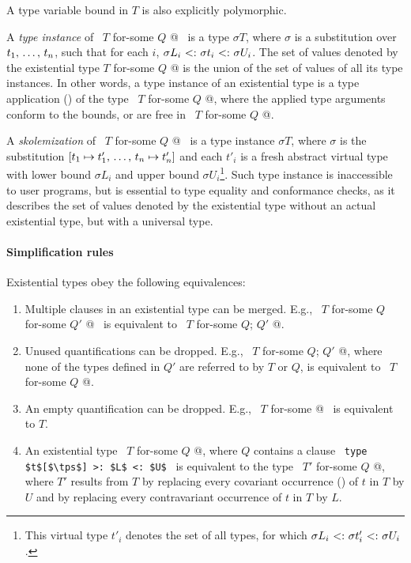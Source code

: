 A type variable bound in $T$ is also explicitly polymorphic. 

A {\em type instance} of ~\lstinline@$T$ for-some { $Q$ }@~ is a type $\sigma T$, where $\sigma$ is a substitution over $t_1 ,\, \ldots ,\, t_n$, such that for each $i$, $\sigma L_i \conforms \sigma t_i \conforms \sigma U_i$. The set of values denoted by the existential type \lstinline@$T$ for-some { $Q$ }@ is the union of the set of values of all its type instances. In other words, a type instance of an existential type is a type application () of the type ~\lstinline@$T$ for-some { $Q$ }@, where the applied type arguments conform to the bounds, or are free in ~\lstinline@$T$ for-some { $Q$ }@. 

A {\em skolemization} of ~\lstinline@$T$ for-some { $Q$ }@~ is a type instance $\sigma T$, where $\sigma$ is the substitution $[t_1 \mapsto t'_1 ,\, \ldots ,\, t_n \mapsto t'_n]$ and each $t'_i$ is a fresh abstract virtual type with lower bound $\sigma L_i$ and upper bound $\sigma U_i$\footnote{This virtual type $t'_i$ denotes the set of all types, for which $\sigma L_i \conforms \sigma t'_i \conforms \sigma U_i$.}. Such type instance is inaccessible to user programs, but is essential to type equality and conformance checks, as it describes the set of values denoted by the existential type without an actual existential type, but with a universal type. 



\paragraph{Simplification rules}
Existential types obey the following equivalences:
\begin{enumerate}
\item
Multiple  clauses in an existential type can be merged. E.g., ~\lstinline@$T$ for-some { $Q$ } for-some { $Q'$ }@~ is equivalent to ~\lstinline@$T$ for-some { $Q$; $Q'$ }@. 

\item
Unused quantifications can be dropped. E.g., ~\lstinline@$T$ for-some { $Q$; $Q'$ }@, where none of the types defined in $Q'$ are referred to by $T$ or $Q$, is equivalent to ~\lstinline@$T$ for-some { $Q$ }@. 

\item
An empty quantification can be dropped. E.g., ~\lstinline@$T$ for-some { }@~ is equivalent to $T$. 

\item
An existential type ~\lstinline@$T$ for-some { $Q$ }@, where $Q$ contains a clause ~\lstinline!type $t$[$\tps$] >: $L$ <: $U$!~ is equivalent to the type ~\lstinline@$T'$ for-some { $Q$ }@, where $T'$ results from $T$ by replacing every covariant occurrence () of $t$ in $T$ by $U$ and by replacing every contravariant occurrence of $t$ in $T$ by $L$. 
\end{enumerate}



